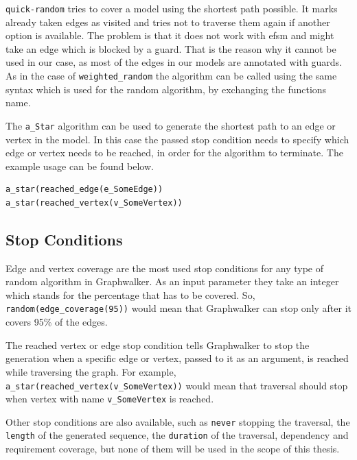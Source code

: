 \par
\texttt{quick-random} tries to cover a model using the shortest path possible. It marks already taken edges as visited and tries not to traverse them again if another option is available. The problem is that it does not work with \acrshort{efsm} and might take an edge which is blocked by a guard. That is the reason why it cannot be used in our case, as most of the edges in our models are annotated with guards. As in the case of \texttt{weighted\_random} the algorithm can be called using the same syntax which is used for the random algorithm, by exchanging the functions name.  

\par
The \texttt{a\_Star} algorithm can be used to generate the shortest path to an edge or vertex in the model. In this case the passed stop condition needs to specify which edge or vertex needs to be reached, in order for the algorithm to terminate. The example usage can be found below.

\begin{lstlisting}
a_star(reached_edge(e_SomeEdge))
a_star(reached_vertex(v_SomeVertex))
\end{lstlisting}

\subsection{Stop Conditions}
\par
Edge and vertex coverage are the most used stop conditions for any type of random algorithm in Graphwalker. As an input parameter they take an integer which stands for the percentage that has to be covered. So, \texttt{random(edge\_coverage(95))} would mean that Graphwalker can stop only after it covers 95\% of the edges.

\par
The reached vertex or edge stop condition tells Graphwalker to stop the generation when a specific edge or vertex, passed to it as an argument, is reached while traversing the graph. For example, \texttt{a\_star(reached\_vertex(v\_SomeVertex))} would mean that traversal should stop when vertex with name \texttt{v\_SomeVertex} is reached.

\par
Other stop conditions are also available, such as \texttt{never} stopping the traversal, the \texttt{length} of the generated sequence, the \texttt{duration} of the traversal, dependency and requirement coverage, but none of them will be used in the scope of this thesis.

